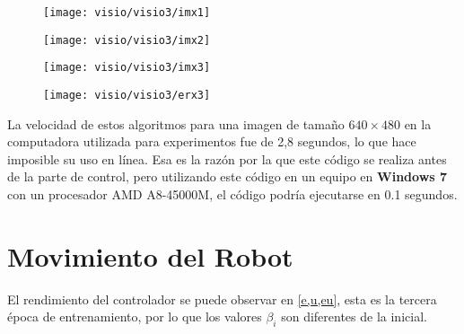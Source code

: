 
\begin{figure}[h]
	\centering
	\texttt{[image: visio/visio3/imx1]}
	\caption{}
	\label{fig:imx1}
\end{figure}
\begin{figure}[h]
	\centering
	\texttt{[image: visio/visio3/imx2]}
	\caption{}
	\label{fig:imx2}
\end{figure}
\begin{figure}[h]
	\centering
	\texttt{[image: visio/visio3/imx3]}
	\caption{}
	\label{fig:imx3}
\end{figure}
\begin{figure}[h]
	\centering
	\texttt{[image: visio/visio3/erx3]}
	\caption{}
	\label{fig:erx2}
\end{figure}








La velocidad de estos algoritmos para una imagen de tamaño $ 640 \times480 $ en la computadora utilizada para experimentos fue de 2,8 segundos, lo que hace imposible su uso en línea. Esa es la razón por la que este código se realiza antes de la parte de control, pero utilizando este código en un equipo en \textbf{Windows 7} con un procesador AMD A8-45000M, el código podría ejecutarse en 0.1 segundos.



\clearpage


\section{Movimiento del Robot}


El rendimiento del controlador se puede observar en \cref{e,u,eu}, esta es la tercera época de entrenamiento, por lo que los valores $ \beta_i $ son diferentes de la inicial.

